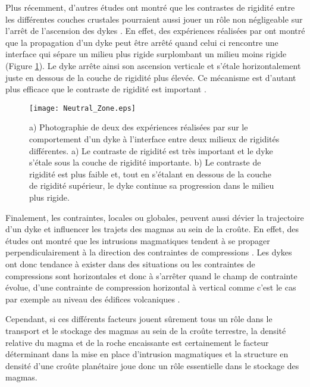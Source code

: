 Plus  récemment, d'autres  études  ont montré  que  les contrastes  de
rigidité  entre les  différentes  couches  crustales pourraient  aussi
jouer un  rôle non  négligeable sur l'arrêt  de l'ascension  des dykes
\citep{Menand:2011ki}.   En  effet,   des  expériences  réalisées  par
\citet{Kavanagh:2006ig} ont  montré que la propagation  d'un dyke peut
être  arrêté quand  celui ci  rencontre  une interface  qui sépare  un
milieu  plus  rigide  surplombant   un  milieu  moins  rigide  (Figure
\ref{Neutral_Zone}). Le  dyke arrête ainsi son  ascension verticale et
s'étale horizontalement juste en dessous de la couche de rigidité plus
élevée. Ce  mécanisme est d'autant  plus efficace que le  contraste de
rigidité est important \citep{Kavanagh:2006ig}.

\begin{figure}[h!]
  \begin{center}
    \graphicspath{ {/Users/thorey/Documents/These/Manuscript/Figure/Chapter1/} }
    \texttt{[image: Neutral\_Zone.eps]}
    \caption{a)  Photographie de  deux des  expériences réalisées  par
      \citet{Kavanagh:2006ig}   sur  le   comportement  d'un   dyke  à
      l'interface entre  deux milieux de rigidités  différentes. a) Le
      contraste de rigidité est très important et le dyke s'étale sous
      la couche de  rigidité importante.  b) Le  contraste de rigidité
      est plus faible et, tout en s'étalant en dessous de la couche de
      rigidité  supérieur, le  dyke  continue sa  progression dans  le
      milieu plus rigide.}
    \label{Neutral_Zone}
  \end{center}
\end{figure}


Finalement, les contraintes, locales ou globales, peuvent aussi dévier
la trajectoire d'un dyke et influencer  les trajets des magmas au sein
de la  croûte.  En  effet, des  études ont  montré que  les intrusions
magmatiques tendent  à se propager perpendiculairement  à la direction
des contraintes de  compressions \citep{Anderson:L5JA3dNN}.  Les dykes
ont donc tendance à exister dans  des situations ou les contraintes de
compressions sont horizontales  et donc à s'arrêter quand  le champ de
contrainte  évolue,  d'une  contrainte  de  compression  horizontal  à
vertical  comme  c'est le  cas  par  exemple  au niveau  des  édifices
volcaniques \citep{Pinel:2000wa,Pinel:2004ji,Roman:2014hw}.

Cependant, si  ces différents  facteurs jouent  sûrement tous  un rôle
dans  le transport  et le  stockage des  magmas au  sein de  la croûte
terrestre, la densité relative du magma et de la roche encaissante est
certainement le facteur déterminant dans  la mise en place d'intrusion
magmatiques et  la structure en  densité d'une croûte  planétaire joue
donc un rôle essentielle dans le stockage des magmas.

